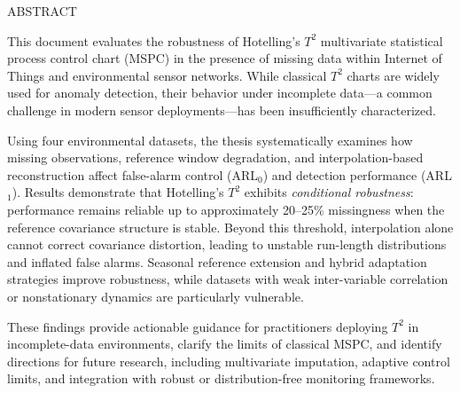 \documentclass[book,onecolumn, 12pt]{IEEEtran}
\begin{document}
% 

\clearpage
\makeatletter
\begingroup
\renewcommand{\thechapter}{\arabic{chapter}}
\tableofcontents
\endgroup
\makeatother

\clearpage
\listoftables
\clearpage
\listoffigures
\clearpage


\doublespace 


\clearpage
\begin{center}
\MakeUppercase{ABSTRACT}
\end{center}

\vspace{1em}
This document evaluates the robustness of Hotelling’s $T^2$ multivariate statistical process control chart (MSPC) in the presence of missing data within Internet of Things and environmental sensor networks. While classical $T^2$ charts are widely used for anomaly detection, their behavior under incomplete data—a common challenge in modern sensor deployments—has been insufficiently characterized.  

Using four environmental datasets, the thesis systematically examines how missing observations, reference window degradation, and interpolation-based reconstruction affect false-alarm control (\ac{ARL}$_0$) and detection performance (\ac{ARL}$_1$). Results demonstrate that Hotelling’s $T^2$ exhibits \emph{conditional robustness}: performance remains reliable up to approximately 20–25\% missingness when the reference covariance structure is stable. Beyond this threshold, interpolation alone cannot correct covariance distortion, leading to unstable run-length distributions and inflated false alarms. Seasonal reference extension and hybrid adaptation strategies improve robustness, while datasets with weak inter-variable correlation or nonstationary dynamics are particularly vulnerable.  

These findings provide actionable guidance for practitioners deploying $T^2$ in incomplete-data environments, clarify the limits of classical MSPC, and identify directions for future research, including multivariate imputation, adaptive control limits, and integration with robust or distribution-free monitoring frameworks.






\clearpage
{}
\setcounter{page}{1}
\mainmatter









\newpage
\clearpage
{}
{}
\printbibliography[title={REFERENCES}]

\clearpage

\appendix




\end{document}
